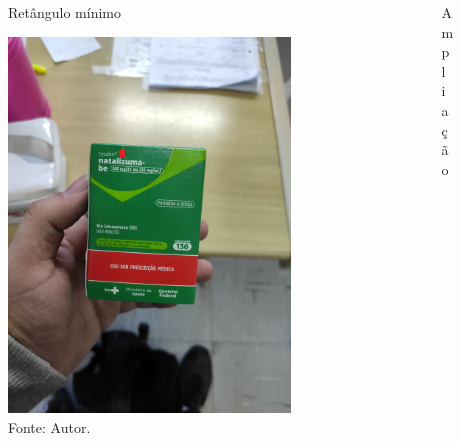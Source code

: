 \begin{frame}
	\begin{columns}
		\begin{column}{0.5\textwidth}
			\begin{figure}
				\caption*{Retângulo mínimo}
				\includegraphics[width=0.85\textwidth]{../pictures/tysabri.jpg}
				\caption*{Fonte: Autor.}
			\end{figure}
		\end{column}
		\begin{column}{0.5\textwidth}
			\centering
			\begin{figure}
				\centering
				\caption*{Ampliação}

\end{figure}
\end{column}
\end{columns}
\end{frame}
